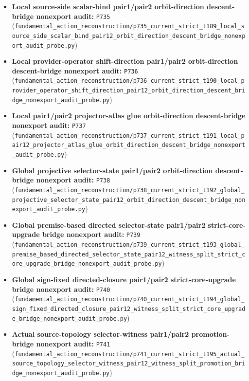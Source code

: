 \documentclass[11pt,a4paper]{article}
\begin{document}
\begin{itemize}
  \item \textbf{Local source-side scalar-bind pair1/pair2 orbit-direction descent-bridge nonexport audit:} \texttt{P735} (\verb|fundamental_action_reconstruction/p735_current_strict_t189_local_source_side_scalar_bind_pair12_orbit_direction_descent_bridge_nonexport_audit_probe.py|)
  \item \textbf{Local provider-operator shift-direction pair1/pair2 orbit-direction descent-bridge nonexport audit:} \texttt{P736} (\verb|fundamental_action_reconstruction/p736_current_strict_t190_local_provider_operator_shift_direction_pair12_orbit_direction_descent_bridge_nonexport_audit_probe.py|)
  \item \textbf{Local pair1/pair2 projector-atlas glue orbit-direction descent-bridge nonexport audit:} \texttt{P737} (\verb|fundamental_action_reconstruction/p737_current_strict_t191_local_pair12_projector_atlas_glue_orbit_direction_descent_bridge_nonexport_audit_probe.py|)
  \item \textbf{Global projective selector-state pair1/pair2 orbit-direction descent-bridge nonexport audit:} \texttt{P738} (\verb|fundamental_action_reconstruction/p738_current_strict_t192_global_projective_selector_state_pair12_orbit_direction_descent_bridge_nonexport_audit_probe.py|)
  \item \textbf{Global premise-based directed selector-state pair1/pair2 strict-core-upgrade bridge nonexport audit:} \texttt{P739} (\verb|fundamental_action_reconstruction/p739_current_strict_t193_global_premise_based_directed_selector_state_pair12_witness_split_strict_core_upgrade_bridge_nonexport_audit_probe.py|)
  \item \textbf{Global sign-fixed directed-closure pair1/pair2 strict-core-upgrade bridge nonexport audit:} \texttt{P740} (\verb|fundamental_action_reconstruction/p740_current_strict_t194_global_sign_fixed_directed_closure_pair12_witness_split_strict_core_upgrade_bridge_nonexport_audit_probe.py|)
  \item \textbf{Actual source-topology selector-witness pair1/pair2 promotion-bridge nonexport audit:} \texttt{P741} (\verb|fundamental_action_reconstruction/p741_current_strict_t195_actual_source_topology_selector_witness_pair12_witness_split_promotion_bridge_nonexport_audit_probe.py|)
\end{itemize}
\end{document}
